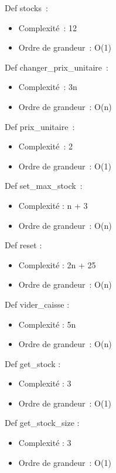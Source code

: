 \documentclass[]{article}
\begin{document}
Def stocks~:

\begin{itemize}
\item
  Complexité~: 12
\item
  Ordre de grandeur~: O(1)
\end{itemize}

Def changer\_prix\_unitaire~:

\begin{itemize}
\item
  Complexité~: 3n
\item
  Ordre de grandeur~: O(n)
\end{itemize}

Def prix\_unitaire~:

\begin{itemize}
\item
  Complexité~: 2
\item
  Ordre de grandeur~: O(1)
\end{itemize}

Def set\_max\_stock~:

\begin{itemize}
\item
  Complexité : n + 3
\item
  Ordre de grandeur~: O(n)
\end{itemize}

Def reset :

\begin{itemize}
\item
  Complexité : 2n + 25
\item
  Ordre de grandeur~: O(n)
\end{itemize}

Def vider\_caisse :

\begin{itemize}
\item
  Complexité : 5n
\item
  Ordre de grandeur~: O(n)
\end{itemize}

Def get\_stock :

\begin{itemize}
\item
  Complexité : 3
\item
  Ordre de grandeur~: O(1)
\end{itemize}

Def get\_stock\_size :

\begin{itemize}
\item
  Complexité : 3
\item
  Ordre de grandeur~: O(1)
\end{itemize}
\end{document}
